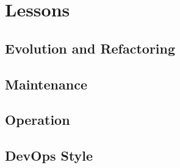 \chapter{Lessons}

\section{Evolution and Refactoring}

\section{Maintenance}

\section{Operation}

\section{DevOps Style}